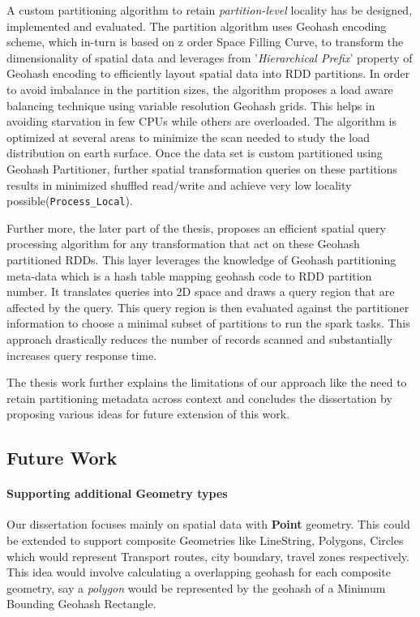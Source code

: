 \documentclass[article,type=msc,colorback,12pt,accentcolor=tud1d]{tudthesis}
\begin{document}
		   A custom partitioning algorithm to retain \textit{partition-level} locality has be designed, implemented and evaluated. The partition algorithm uses Geohash encoding scheme, which in-turn is based on z order Space Filling Curve, to transform the dimensionality of spatial data and leverages from '\textit{Hierarchical Prefix}' property of Geohash encoding to efficiently layout spatial data into RDD partitions. In order to avoid imbalance in the partition sizes, the algorithm proposes a load aware balancing technique using variable resolution Geohash grids. This helps in avoiding starvation in few CPUs while others are overloaded. The algorithm is optimized at several areas to minimize the scan needed to study the load distribution on earth surface. Once the data set is custom partitioned using Geohash Partitioner, further spatial transformation queries on these partitions results in minimized shuffled read/write and achieve very low locality possible(\texttt{Process\_Local}). 
		   
		   Further more, the later part of the thesis, proposes an efficient spatial query processing algorithm for any transformation that act on these Geohash partitioned RDDs. This layer leverages the knowledge of Geohash partitioning meta-data which is a hash table mapping geohash code to RDD partition number. It translates queries into 2D space and draws a query region that are affected by the query. This query region is then evaluated against the partitioner information to choose a minimal subset of partitions to run the spark tasks. This approach drastically reduces the number of records scanned and substantially increases query response time. 
		   
		   The thesis work further explains the limitations of our approach like the need to retain partitioning metadata across context and concludes the dissertation by proposing various ideas for future extension of this work.
		   		   
		   \clearpage
	   	   \subsection{Future Work}
	   	   
	   	   \paragraph{Supporting additional Geometry types} 
	   	   
	   	   Our dissertation focuses mainly on spatial data with \textbf{Point} geometry. This could be extended to support composite Geometries like LineString, Polygons, Circles which would represent Transport routes, city boundary, travel zones respectively. This idea would involve calculating a overlapping geohash for each composite geometry, say a \textit{polygon} would be represented by the geohash of a Minimum Bounding Geohash Rectangle.
   	  
\end{document}
